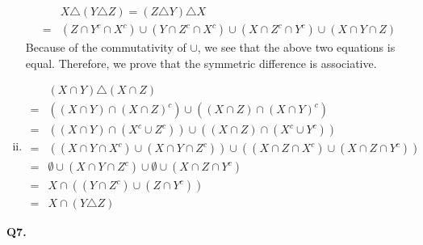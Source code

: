 \documentclass{article}[12pt]
\begin{document}
\begin{enumerate}[(i)]
\begin{align*}
&X \triangle (Y \triangle Z)=(Z \triangle Y)\triangle X\\
=&(Z \cap Y^c\cap X^c)\cup (Y \cap Z^c\cap X^c)\cup (X\cap Z^c \cap Y^c) \cup (X\cap Y\cap Z)
\end{align*}
Because of the commutativity of $\cup$, we see that the above two equations is equal. Therefore, we prove that the symmetric difference is associative.
\item \begin{align*}
&(X \cap Y) \triangle(X \cap Z)\\
=& ((X\cap Y)\cap (X\cap Z)^c)\cup ((X\cap Z)\cap (X\cap Y)^c)\\
=& ((X\cap Y)\cap (X^c \cup Z^c))\cup ((X\cap Z)\cap (X^c\cup Y^c))\\
=& ((X\cap Y\cap X^c) \cup (X\cap Y\cap Z^c))\cup ((X\cap Z\cap X^c)\cup (X\cap Z\cap  Y^c))\\
=& \emptyset\cup (X\cap Y\cap Z^c)\cup \emptyset \cup(X\cap Z\cap  Y^c)\\
=& X\cap ((Y\cap Z^c)\cup ( Z\cap  Y^c))\\
=& X \cap(Y \triangle Z)
\end{align*}
\end{enumerate}
\noindent \textbf{Q7.}
\end{document}
